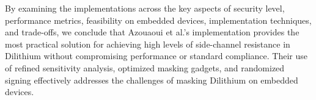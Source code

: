 By examining the implementations across the key aspects of security level, performance metrics, feasibility on embedded devices, implementation techniques, and trade-offs, we conclude that Azouaoui et al.'s implementation provides the most practical solution for achieving high levels of side-channel resistance in Dilithium without compromising performance or standard compliance. Their use of refined sensitivity analysis, optimized masking gadgets, and randomized signing effectively addresses the challenges of masking Dilithium on embedded devices.
